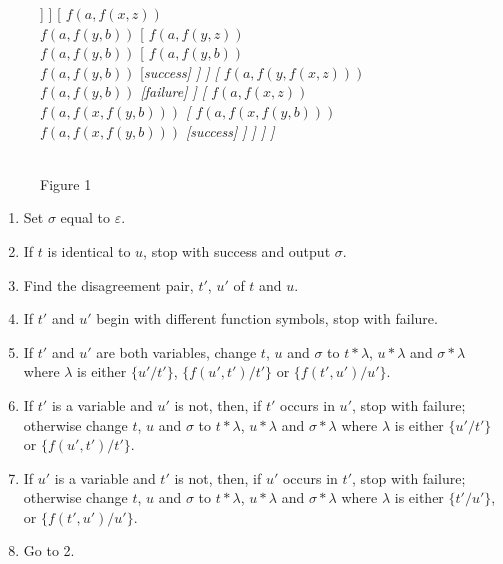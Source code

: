 \documentclass[letterpaper]{report}
\begin{document}
\begin{figure}[h]
\begin{forest} 
[
	{$f(x, z)$\\ $f(a, f(y, b))$}
	[
		{$f(a, z)$\\ $f(a, f(y, b))$}
		[
			{$f(a, f(y, b))$\\ $f(a, f(y, b))$}
			[\it success]
		]
	]
	[
		{$f(a, f(x, z))$\\ $f(a, f(y, b))$}
		[
			{$f(a, f(y, z))$\\ $f(a, f(y, b))$}
			[
				{$f(a, f(y, b))$\\ $f(a, f(y, b))$}
				[\it success]
			]
		]
		[
			{$f(a, f(y, f(x, z)))$\\ $f(a, f(y, b))$}
			[\it failure]
		]
		[
			{$f(a, f(x, z))$\\ $f(a, f(x, f(y, b)))$}
			[
				{$f(a, f(x, f(y, b)))$\\ $f(a, f(x, f(y, b)))$}
				[\it success]
			]
		]
	]
]
\end{forest}\\
\small Figure 1
\end{figure}


\begin{enumerate}
	\def\labelenumi{(\arabic{enumi})}
	\item
	Set $\sigma$ equal to $\varepsilon$.
	\item
	If $t$ is identical to $u$, stop with success and output
	$\sigma$.
	\item
	Find the disagreement pair, $t'$, $u'$ of $t$
	and $u$.
	\item
	If $t'$ and $u'$ begin with different function
	symbols, stop with failure.
	\item
	If $t'$ and $u'$ are both variables, change $t$,
	$u$ and $\sigma$ to $t*\lambda$, $u*\lambda$ and
	$\sigma*\lambda$ where $\lambda$ is either
	$\{u'/t'\}$,
	$\{f(u',t')/t'\}$ or
	$\{f(t',u')/u'\}$.
	\item
	If $t'$ is a variable and $u'$ is not, then, if
	$t'$ occurs in $u'$, stop with failure; otherwise
	change $t$, $u$ and $\sigma$ to $t*\lambda$, $u*\lambda$ and
	$\sigma*\lambda$ where $\lambda$ is either
	$\{u'/t'\}$ or
	$\{f(u',t')/t'\}$.
	\item
	If $u'$ is a variable and $t'$ is not, then, if
	$u'$ occurs in $t'$, stop with failure; otherwise
	change $t$, $u$ and $\sigma$ to $t*\lambda$, $u*\lambda$ and
	$\sigma*\lambda$ where $\lambda$ is either
	$\{t'/u'\}$, or
	$\{f(t',u')/u'\}$.
	\item
	Go to 2.
\end{enumerate}
\end{document}
